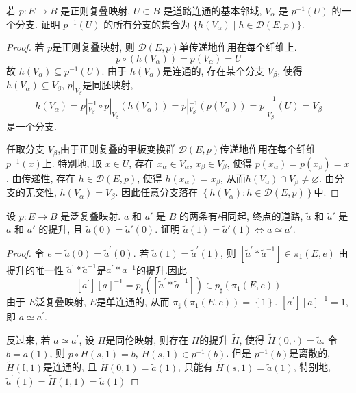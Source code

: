 \documentclass[../main.tex]{subfiles}
\begin{document}
\begin{exercise}{}{}
若 $p: E \to B$ 是正则复叠映射, $U \subset B$ 是道路连通的基本邻域, $V_\alpha$ 是 $p^{-1}(U)$ 的一个分支. 证明 $p^{-1}(U)$ 的所有分支的集合为 $\{h(V_\alpha) \mid h \in \mathscr{D}(E, p)\}$.
\end{exercise}
\begin{proof}
若 $p$是正则复叠映射, 则 $\mathscr{D}\left(E,p\right)$单传递地作用在每个纤维上.
  $$ p\circ \left(h\left(V_{\alpha }\right)\right)= p\left(V_{\alpha }\right)= U $$
故 $h\left(V_{\alpha }\right)\subseteq  p^{-1} \left(U\right)$. 由于 $h\left(V_{\alpha }\right)$是连通的, 存在某个分支 $V_{\beta }$, 使得 $h\left(V_{\alpha }\right)\subseteq V_{\beta }$, $p|_{V_{\beta   }}$是同胚映射,
 $$ h\left(V_{\alpha }\right)= p|_{V_{\beta }}^{-1}  \circ p|_{V_{\beta }}\left(h\left(V_{\alpha }\right)\right)= p|_{V_{\beta }}^{-1} \left(p\left(V_{\alpha }\right)\right)= p|_{V_{\beta }}^{-1} \left(U\right)= V_{\beta } $$
是一个分支.

任取分支 $V_{\beta }$,由于正则复叠的甲板变换群 $\mathscr{D}\left(E,p\right)$传递地作用在每个纤维 $p^{-1} \left(x\right)$上. 特别地, 取 $x\in U$, 存在 $x_{\alpha }\in V_{\alpha }$, $x_{\beta }\in V_{\beta }$, 使得 $p\left(x_{\alpha }\right)= p\left(x_{\beta }\right)= x$. 由传递性, 存在 $h\in \mathscr{D}\left(E,p\right)$, 使得 $h\left(x_{\alpha }\right)= x_{\beta }$, 从而$h\left(V_{\alpha }\right)\cap V_{\beta }\neq \varnothing$. 由分支的无交性, $h\left(V_{\alpha }\right)= V_{\beta }$. 因此任意分支落在 $\left\{ h\left(V_{\alpha }\right):h\in \mathscr{D}\left(E,p\right) \right\}$中.
\end{proof}
\begin{exercise}{}{}
设 $p: E \to B$ 是泛复叠映射. $a$ 和 $a'$ 是 $B$ 的两条有相同起, 终点的道路, $\tilde{a}$ 和 $\tilde{a}'$ 是 $a$ 和 $a'$ 的提升, 且 $\tilde{a}(0)=\tilde{a}'(0)$. 证明 $\tilde{a}(1)=\tilde{a}'(1) \iff a \simeq a'$.
\end{exercise}
\begin{proof}
令 $e= \tilde{a}\left(0\right)= \tilde{a}^{\prime} \left(0\right)$. 若 $\tilde{a}\left(1\right)= \tilde{a}^{\prime} \left(1\right)$, 则 $[\tilde{a}^{\prime} *\tilde{a}^{-1} ]\in \pi _1 \left(E,e\right)$
由提升的唯一性 $\tilde{a}^{\prime} * \tilde{a}^{-1}$是$a^{\prime} *a^{-1}$的提升.因此
$$ [a^{\prime} ][a]^{-1} = p_{\sharp }\left([\tilde{a}^{\prime} *\tilde{a}^{-1} ]\right)\in p_{\sharp }\left(\pi _1 \left(E,e\right)\right) $$
由于 $E$泛复叠映射, $E$是单连通的, 从而 $\pi _{\sharp }\left(\pi _1 \left(E,e\right)\right)=\left\{ 1 \right\}$. $\left[ a^{\prime}  \right]\left[ a \right]^{-1} = 1$, 即 $a\simeq a^{\prime}$.

反过来, 若 $a\simeq a^{\prime}$, 设 $H$是同伦映射, 则存在 $H$的提升 $\widetilde{H}$, 使得 $\widetilde{H}\left(0,\cdot \right)= \tilde{a}$. 令 $b= a\left(1\right)$, 则 $p\circ \widetilde{H}\left(s,1\right)=b$, $\widetilde{H} \left(s,1\right)\in p^{-1} \left(b\right)$. 但是 $p^{-1} \left(b\right)$是离散的,  $\widetilde{H}\left(\mathbb{I},1\right)$是连通的, 且 $\widetilde{H}\left(0,1\right)=\tilde{a}\left(1\right)$, 只能有 $\widetilde{H}\left(s,1\right)= \tilde{a}\left(1\right)$, 特别地, $\tilde{a}^{\prime} \left(1\right)= \widetilde{H}\left(1,1\right)= \tilde{a}\left(1\right)$
\end{proof}
\end{document}
